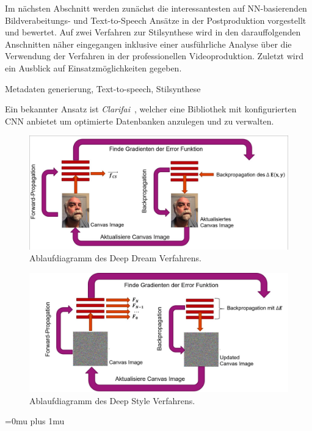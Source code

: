 \documentclass[times, 12pt,twocolumn]{article}
\begin{document}
Im nächsten Abschnitt werden zunächst die interessantesten auf NN-basierenden Bildverabeitungs- und Text-to-Speech Ansätze in der Postproduktion vorgestellt und bewertet. Auf zwei Verfahren zur Stilsynthese wird in den darauffolgenden Anschnitten näher eingegangen inklusive einer ausführliche Analyse über die Verwendung der Verfahren in der professionellen Videoproduktion. Zuletzt wird ein Ausblick auf Einsatzmöglichkeiten gegeben.

 \label{sec:SOTAPostproduktion}
Metadaten generierung, Text-to-speech, Stilsynthese

Ein bekannter Ansatz ist \textit{Clarifai}~\cite{MITReview}, welcher eine Bibliothek mit konfigurierten CNN anbietet um optimierte Datenbanken anzulegen und zu verwalten.

\begin{figure}
	\flushleft
	\includegraphics[width=\columnwidth]{Bilder/DeepDream.jpg}
	\caption{Ablaufdiagramm des Deep Dream Verfahrens.}
	\label{fig:DeepDream}
\end{figure}


\begin{figure}
	\flushleft
	\includegraphics[width=\columnwidth]{Bilder/DeepStyle.jpg}
	\caption{Ablaufdiagramm des Deep Style Verfahrens.}
	\label{fig:DeepStyle}
\end{figure}

 \label{Fazit}



\newpage
\Urlmuskip=0mu plus 1mu\relax %
 

\end{document}
